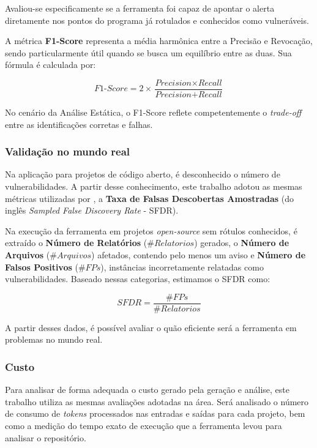 \documentclass[
    12pt,                %
    openright,           %
    oneside,             %
    a4paper,             %
    english,             %
    brazil               %
]{abntex2}
\begin{document}
\vspace{\onelineskip}
\par
Avaliou-se especificamente se a ferramenta foi capaz de apontar o alerta diretamente nos pontos do programa já rotulados e conhecidos como vulneráveis.
\par
A métrica \textbf{F1-Score} representa a média harmônica entre a Precisão e Revocação, sendo particularmente útil quando se busca um equilíbrio entre as duas.
Sua fórmula é calculada por:

\begin{equation}
  \textit{F1-Score} = 2 \times \frac{\textit{Precision} \times \textit{Recall}}{\textit{Precision} + \textit{Recall}}
\end{equation}

\vspace{\onelineskip}
\par
No cenário da Análise Estática, o F1-Score reflete competentemente o \textit{trade-off} entre as identificações corretas e falhas.

\subsubsection{Validação no mundo real}
\label{sec:validademundoreal}
\par
Na aplicação para projetos de código aberto, é desconhecido o número de vulnerabilidades.
A partir desse conhecimento, este trabalho adotou as mesmas métricas utilizadas por , a \textbf{Taxa de Falsas Descobertas Amostradas} (do inglês \textit{Sampled False Discovery Rate} - SFDR).
\par
Na execução da ferramenta em projetos \textit{open-source} sem rótulos conhecidos, é extraído o \textbf{Número de Relatórios} ($\#Relatorios$) gerados, o \textbf{Número de Arquivos} ($\#Arquivos$) afetados, contendo pelo menos um aviso e \textbf{Número de Falsos Positivos} ($\#FPs$), instâncias incorretamente relatadas como vulnerabilidades.
Baseado nessas categorias, estimamos o SFDR como:

\begin{equation}
  SFDR = \frac{\#FPs}{\#Relatorios}
\end{equation}

\vspace{\onelineskip}
A partir desses dados, é possível avaliar o quão eficiente será a ferramenta em problemas no mundo real.

\subsubsection{Custo}
\label{sec:custo}
\par
Para analisar de forma adequada o custo gerado pela geração e análise, este trabalho utiliza as mesmas avaliações adotadas na área.
Será analisado o número de consumo de \textit{tokens} processados nas entradas e saídas para cada projeto, bem como a medição do tempo exato de execução que a ferramenta levou para analisar o repositório.
\end{document}
